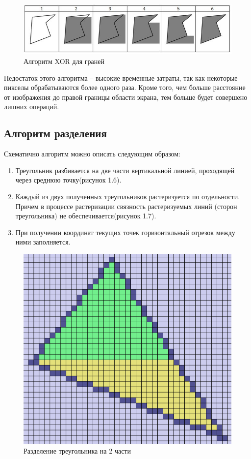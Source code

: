 \documentclass[12pt,a4paper,oneside]{report}
\begin{document}
 	\begin{figure}[H]
 		\centering
 		\includegraphics[scale=0.7]{fill_poly_001}
 		\caption{Алгоритм XOR для граней}
 	\end{figure}
 	
 	 Недостаток этого алгоритма – высокие временные затраты, так как некоторые пикселы обрабатываются более одного раза. Кроме того, чем больше расстояние от изображения до правой границы области экрана, тем больше будет совершено лишних операций.
 	
 	\subsection{Алгоритм разделения}
 	 \quad Схематично алгоритм можно описать следующим образом:
 	\begin{enumerate}
 		\item Треугольник разбивается на две части вертикальной линией, проходящей через среднюю точку(рисунок 1.6).
 		\item Каждый из двух полученных треугольников растеризуется по отдельности. Причем в процессе растеризации связность растеризуемых линий (сторон треугольника) не обеспечивается(рисунок 1.7).
 		\item При получении координат текущих точек горизонтальный отрезок между ними заполняется.
 	\end{enumerate}
 
	\begin{figure}[H]
		\centering
		\includegraphics[scale=0.4]{11_triangle}
		\caption{Разделение треугольника на 2 части}
	\end{figure}
\end{document}
